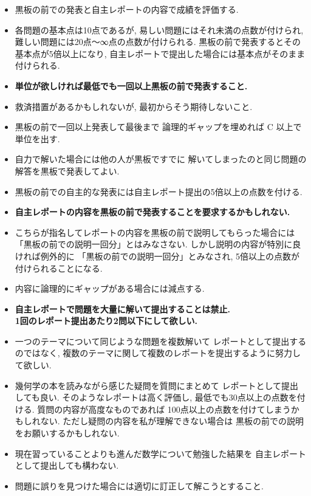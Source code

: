 \documentclass[12pt,twoside]{jarticle}
\begin{document}
{\small
\begin{itemize}
 \item 黒板の前での発表と自主レポートの内容で成績を評価する.
 \item 各問題の基本点は10点であるが, 
       易しい問題にはそれ未満の点数が付けられ, 
       難しい問題には20点〜∞点の点数が付けられる.
       黒板の前で発表するとその基本点が5倍以上になり, 
       自主レポートで提出した場合には基本点がそのまま付けられる.
 \item {\bf 単位が欲しければ最低でも一回以上黒板の前で発表すること.}
 \item 救済措置があるかもしれないが, 最初からそう期待しないこと.
 \item 黒板の前で一回以上発表して最後まで
       論理的ギャップを埋めれば C 以上で単位を出す.
 \item 自力で解いた場合には他の人が黒板ですでに
       解いてしまったのと同じ問題の解答を黒板で発表してよい.
 \item 黒板の前での自主的な発表には自主レポート提出の5倍以上の点数を付ける.
 \item {\bf 自主レポートの内容を黒板の前で発表することを要求するかもしれない.}
 \item こちらが指名してレポートの内容を黒板の前で説明してもらった場合には
       「黒板の前での説明一回分」とはみなさない.
       しかし説明の内容が特別に良ければ例外的に
       「黒板の前での説明一回分」とみなされ, 
       5倍以上の点数が付けられることになる.
 \item 内容に論理的にギャップがある場合には減点する.
 \item {\bf 自主レポートで問題を大量に解いて提出することは禁止.\\
       1回のレポート提出あたり2問以下にして欲しい.}
 \item 一つのテーマについて同じような問題を複数解いて
       レポートとして提出するのではなく, 
       複数のテーマに関して複数のレポートを提出するように努力して欲しい.
 \item 幾何学の本を読みながら感じた疑問を質問にまとめて
       レポートとして提出しても良い.
       そのようなレポートは高く評価し, 
       最低でも30点以上の点数を付ける.
       質問の内容が高度なものであれば
       100点以上の点数を付けてしまうかもしれない.
       ただし疑問の内容を私が理解できない場合は
       黒板の前での説明をお願いするかもしれない.
 \item 現在習っていることよりも進んだ数学について勉強した結果を
       自主レポートとして提出しても構わない.
 \item 問題に誤りを見つけた場合には適切に訂正して解こうとすること.
\end{itemize}
}
\end{document}
